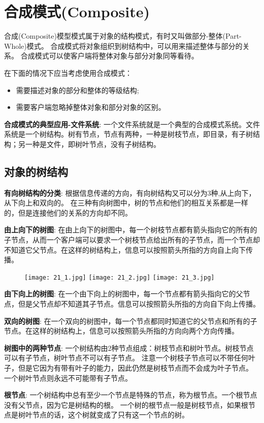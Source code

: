 \documentclass[../main.tex]{subfiles}
\begin{document}
%
\section{合成模式(Composite)}
合成(Composite)模型模式属于对象的结构模式，有时又叫做部分-整体(Part-Whole)模式。
合成模式将对象组织到树结构中，可以用来描述整体与部分的关系。
合成模式可以使客户端将整体对象与部分对象同等看待。

在下面的情况下应当考虑使用合成模式：
\begin{itemize}
  \item 需要描述对象的部分和整体的等级结构;
  \item 需要客户端忽略掉整体对象和部分对象的区别。
\end{itemize}
%
\textbf{合成模式的典型应用-文件系统}:
一个文件系统就是一个典型的合成模式系统。文件系统是一个树结构。树有节点，节点有两种，一种是树枝节点，即目录，有子树结构；另一种是文件，即树叶节点，没有子树结构。
%
\subsection{对象的树结构}
%
\textbf{有向树结构的分类}:
根据信息传递的方向，有向树结构又可以分为3种,从上向下，从下向上和双向的。
在三种有向树图中，树的节点和他们的相互关系都是一样的，但是连接他们的关系的方向却不同。

\textbf{由上向下的树图}:
在由上向下的树图中，每一个树枝节点都有箭头指向它的所有的子节点，从而一个客户端可以要求一个树枝节点给出所有的子节点，而一个节点却不知道它父节点。在这样的树结构上，信息可以按照箭头所指的方向自上向下传播。
%
\begin{figure}[H]
  \texttt{[image: 21\_1.jpg]}
  \texttt{[image: 21\_2.jpg]}
  \texttt{[image: 21\_3.jpg]}
\end{figure}
%
\textbf{由下向上的树图}:
在一个由下向上的树图中，每一个节点都有箭头指向它的父节点，但是父节点却不知道其子节点。信息可以按照箭头所指的方向自下向上传播。

\textbf{双向的树图}:
在一个双向的树图中，每一个节点都同时知道它的父节点和所有的子节点。在这样的树结构上，信息可以按照箭头所指的方向向两个方向传播。

\textbf{树图中的两种节点}:
一个树结构由2种节点组成：树枝节点和树叶节点。树枝节点可以有子节点，树叶节点不可以有子节点。
注意一个树枝子节点可以不带任何叶子，但是它因为有带有叶子的能力，因此仍然是树枝节点而不会成为叶子节点。
一个树叶节点则永远不可能带有子节点。

\textbf{根节点}:
一个树结构中总有至少一个节点是特殊的节点，称为根节点。一个根节点没有父节点，因为它是树结构的根。
一个树的根节点一般是树枝节点，如果根节点是树叶节点的话，这个树就变成了只有这一个节点的树。
\end{document}
